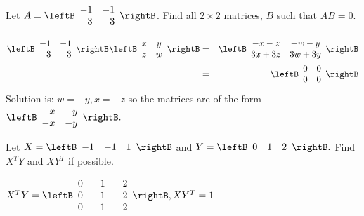 \begin{enumialphparenastyle}
\begin{ex} Let $A=\leftB
\begin{array}{rr}
-1 & -1 \\
3 & 3
\end{array}
\rightB $. Find all $2\times 2$ matrices, $B$
such that $AB=0.$ 
\begin{sol}
\begin{eqnarray*}
\leftB
\begin{array}{rr}
-1 & -1 \\
3 & 3
\end{array}
\rightB \leftB
\begin{array}{cc}
x & y \\
z & w
\end{array}
\rightB  &=&\leftB
\begin{array}{cc}
-x-z & -w-y \\
3x+3z & 3w+3y
\end{array}
\rightB  \\
&=&\leftB
\begin{array}{cc}
0 & 0 \\
0 & 0
\end{array}
\rightB
\end{eqnarray*}
Solution is: $ w=-y,x=-z $ so the
matrices are of the form $\leftB
\begin{array}{rr}
x & y \\
-x & -y
\end{array}
\rightB.$
\end{sol}
\end{ex}


\begin{ex} Let $X=\leftB 
\begin{array}{rrr}
-1 & -1 & 1
\end{array}
\rightB $ and $Y=\leftB
\begin{array}{rrr}
0 & 1 & 2
\end{array}
\rightB .$ Find $X^{T}Y$ and $XY^{T}$ if
possible. 
\begin{sol}
$X^{T}Y = \leftB \begin{array}{rrr}
0 & -1 & -2 \\
0 & -1 & -2 \\
0 & 1 & 2
\end{array}
\rightB , XY^{T} = 1$
\end{sol}
\end{ex}



\end{enumialphparenastyle}
